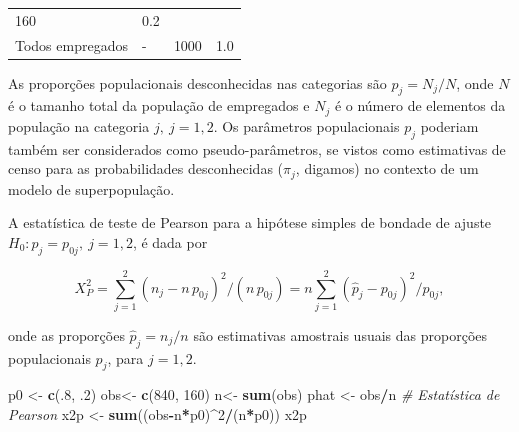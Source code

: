 \documentclass[]{book}
\newenvironment{Shaded}{\begin{snugshade}}{\end{snugshade}}
\newcommand{\KeywordTok}[1]{\textcolor[rgb]{0.13,0.29,0.53}{\textbf{#1}}}
\newcommand{\DecValTok}[1]{\textcolor[rgb]{0.00,0.00,0.81}{#1}}
\newcommand{\StringTok}[1]{\textcolor[rgb]{0.31,0.60,0.02}{#1}}
\newcommand{\CommentTok}[1]{\textcolor[rgb]{0.56,0.35,0.01}{\textit{#1}}}
\newcommand{\OperatorTok}[1]{\textcolor[rgb]{0.81,0.36,0.00}{\textbf{#1}}}
\newcommand{\NormalTok}[1]{#1}
\theoremstyle{definition}
\theoremstyle{definition}
\theoremstyle{definition}
\theoremstyle{remark}
\begin{document}
\begin{longtable}[]{@{}llll@{}}
\begin{minipage}[t]{0.07\columnwidth}
160\strut
\end{minipage} & \begin{minipage}[t]{0.11\columnwidth}\raggedright\strut
0.2\strut
\end{minipage}\tabularnewline
\begin{minipage}[t]{0.23\columnwidth}\raggedright\strut
Todos empregados\strut
\end{minipage} & \begin{minipage}[t]{0.05\columnwidth}\raggedright\strut
-\strut
\end{minipage} & \begin{minipage}[t]{0.07\columnwidth}\raggedright\strut
1000\strut
\end{minipage} & \begin{minipage}[t]{0.11\columnwidth}\raggedright\strut
1.0\strut
\end{minipage}\tabularnewline
\bottomrule
\end{longtable}

As proporções populacionais desconhecidas nas categorias são
\(p_{j}=N_{j}/N\), onde \(N\) é o tamanho total da população de
empregados e \(N_{j}\) é o número de elementos da população na categoria
\(j,\ j=1,2\). Os parâmetros populacionais \(p_{j}\) poderiam também ser
considerados como pseudo-parâmetros, se vistos como estimativas de censo
para as probabilidades desconhecidas (\(\pi _{j}\), digamos) no contexto
de um modelo de superpopulação.

A estatística de teste de Pearson para a hipótese simples de bondade de
ajuste \(H_{0}:p_{j}=p_{0j},\ j=1,2\), é dada por

\begin{equation}
X_{P}^{2}=\sum\limits_{j=1}^{2}\left( n_{j}-n\,p_{0j}\right)
^{2}/\left( n\,p_{0j}\right) =n\sum\limits_{j=1}^{2}\left( 
\widehat{p}_{j}-p_{0j}\right) ^{2}/p_{0j},  
\label{eq:qual1}
\end{equation}

onde as proporções \(\widehat{p}_{j}=n_{j}/n\) são estimativas amostrais
usuais das proporções populacionais \(p_{j}\), para \(j=1,2\).

\begin{Shaded}
\begin{Highlighting}[]
\NormalTok{p0 <-}\StringTok{ }\KeywordTok{c}\NormalTok{(.}\DecValTok{8}\NormalTok{, .}\DecValTok{2}\NormalTok{)}
\NormalTok{obs<-}\StringTok{ }\KeywordTok{c}\NormalTok{(}\DecValTok{840}\NormalTok{, }\DecValTok{160}\NormalTok{)}
\NormalTok{n<-}\StringTok{ }\KeywordTok{sum}\NormalTok{(obs)}
\NormalTok{phat <-}\StringTok{ }\NormalTok{obs}\OperatorTok{/}\NormalTok{n}
\CommentTok{# Estatística de Pearson}
\NormalTok{x2p <-}\StringTok{ }\KeywordTok{sum}\NormalTok{((obs}\OperatorTok{-}\NormalTok{n}\OperatorTok{*}\NormalTok{p0)}\OperatorTok{^}\DecValTok{2}\OperatorTok{/}\NormalTok{(n}\OperatorTok{*}\NormalTok{p0))}
\NormalTok{x2p}
\end{Highlighting}
\end{Shaded}
\end{document}
